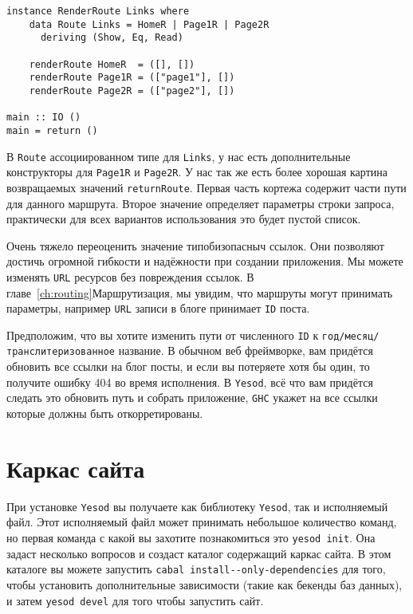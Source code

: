 \begin{lstlisting}
instance RenderRoute Links where
    data Route Links = HomeR | Page1R | Page2R
      deriving (Show, Eq, Read)

    renderRoute HomeR  = ([], [])
    renderRoute Page1R = (["page1"], [])
    renderRoute Page2R = (["page2"], [])

main :: IO ()
main = return ()
\end{lstlisting}

В \lstinline!Route! ассоциированном типе для \lstinline!Links!, у нас 
есть дополнительные конструкторы для \lstinline!Page1R! и 
\lstinline!Page2R!. У нас так же есть более хорошая картина 
возвращаемых значений \lstinline!returnRoute!. Первая часть кортежа 
содержит части пути для данного маршрута. Второе значение определяет
параметры строки запроса, практически для всех вариантов использования это будет пустой список.

Очень тяжело переоценить значение типобизопасныч ссылок. Они позволяют 
достичь огромной гибкости и надёжности при создании приложения. Мы можете 
изменять \texttt{URL} ресурсов без повреждения ссылок. 
В главе~\ref{ch:routing}Маршрутизация, мы увидим, что маршруты могут 
принимать параметры, например \texttt{URL} записи в блоге принимает 
\texttt{ID} поста.

Предположим, что вы хотите изменить пути от численного \texttt{ID} к 
\texttt{год/месяц/транслитеризованное} название. В обычном 
веб фреймворке, вам придётся обновить все ссылки на блог посты, и если вы потеряете хотя бы один, то 
получите ошибку 404 во время исполнения. В \texttt{Yesod}, всё что вам придётся следать это обновить 
путь и собрать приложение, \texttt{GHC} укажет на все ссылки которые должны быть откорретированы.

\section{Каркас сайта}

При установке \texttt{Yesod} вы получаете как библиотеку \texttt{Yesod}, 
так и исполняемый файл. Этот исполняемый файл может принимать небольшое 
количество команд, но первая команда с какой вы захотите познакомиться 
это \texttt{yesod init}. Она задаст несколько вопросов и создаст каталог 
содержащий каркас сайта. В этом каталоге
вы можете запустить \lstinline'cabal install--only-dependencies' для того, чтобы установить дополнительные
зависимости (такие как бекенды баз данных), и затем \lstinline'yesod devel' для того чтобы запустить сайт.

